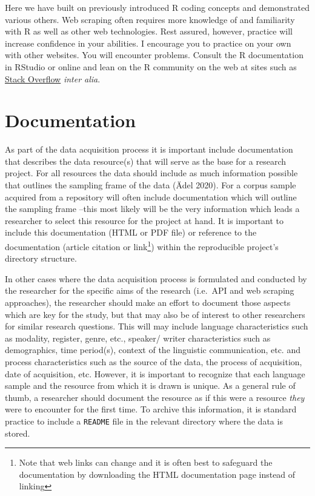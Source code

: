 \documentclass[
  letterpaper,
]{latex/krantz}
\begin{document}
Here we have built on previously introduced R coding concepts and
demonstrated various others. Web scraping often requires more knowledge
of and familiarity with R as well as other web technologies. Rest
assured, however, practice will increase confidence in your abilities. I
encourage you to practice on your own with other websites. You will
encounter problems. Consult the R documentation in RStudio or online and
lean on the R community on the web at sites such as
\href{https://stackoverflow.com/}{Stack Overflow} \emph{inter alia}.

\hypertarget{documentation-1}{%
\section{Documentation}\label{documentation-1}}

As part of the data acquisition process it is important include
documentation that describes the data resource(s) that will serve as the
base for a research project. For all resources the data should include
as much information possible that outlines the sampling frame of the
data (Ädel 2020). For a corpus sample acquired from a repository will
often include documentation which will outline the sampling frame --this
most likely will be the very information which leads a researcher to
select this resource for the project at hand. It is important to include
this documentation (HTML or PDF file) or reference to the documentation
(article citation or link\footnote{Note that web links can change and it
  is often best to safeguard the documentation by downloading the HTML
  documentation page instead of linking}) within the reproducible
project's directory structure.

In other cases where the data acquisition process is formulated and
conducted by the researcher for the specific aims of the research
(i.e.~API and web scraping approaches), the researcher should make an
effort to document those aspects which are key for the study, but that
may also be of interest to other researchers for similar research
questions. This will may include language characteristics such as
modality, register, genre, etc., speaker/ writer characteristics such as
demographics, time period(s), context of the linguistic communication,
etc. and process characteristics such as the source of the data, the
process of acquisition, date of acquisition, etc. However, it is
important to recognize that each language sample and the resource from
which it is drawn is unique. As a general rule of thumb, a researcher
should document the resource as if this were a resource \emph{they} were
to encounter for the first time. To archive this information, it is
standard practice to include a \texttt{README} file in the relevant
directory where the data is stored.
\end{document}
